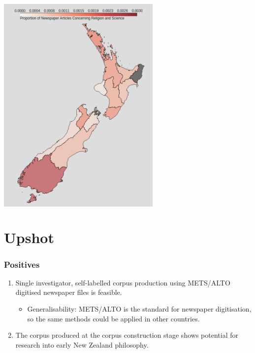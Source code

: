 \documentclass[10pt, compress]{beamer}
\begin{document}
\begin{frame}
	\begin{center}
		\includegraphics[width=0.6\textwidth]{images/choropleth.png}
	\end{center}

\end{frame}


\section{Upshot}


\begin{frame}
	\frametitle{Positives}

	\pause

  \begin{enumerate}[<+- | alert@+>]
		\item Single investigator, self-labelled corpus production using METS/ALTO digitised newspaper files is feasible.
		\begin{itemize}
			\item Generalisability: METS/ALTO is the standard for newspaper digitisation, so the same methods could be applied in other countries.
		\end{itemize}
		\item The corpus produced at the corpus construction stage shows potential for research into early New Zealand philosophy.
	\end{enumerate}

\end{frame}
\end{document}

